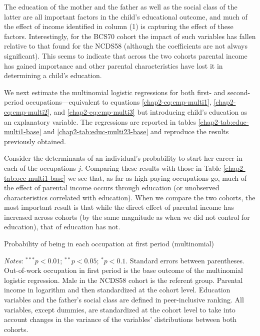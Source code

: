 The education of the mother and the father as well as the social class of the latter are all important factors in the child's educational outcome, and much of the effect of income identified in column (1) is capturing the effect of these factors. Interestingly, for the BCS70 cohort the impact of such variables has fallen relative to that found for the NCDS58 (although the coefficients are not always significant). This seems to indicate that across the two cohorts parental income has gained importance and other parental characteristics have lost it in determining a child's education.

We next estimate the multinomial logistic regressions for both first- and second-period occupations---equivalent to equations \eqref{chap2-eq:emp-multi1}, \eqref{chap2-eq:emp-multi2}, and \eqref{chap2-eq:emp-multi3} but introducing child's education as an explanatory variable.  The regressions are reported in tables \ref{chap2-tab:educ-multi1-base} and \ref{chap2-tab:educ-multi23-base} and reproduce the results previously obtained. 

Consider the determinants of an individual's probability to start her career in each of the occupations $j$. Comparing these results with those in Table  \ref{chap2-tab:occ-multi1-base} we see that, as far as high-paying occupations go, much of the effect of parental income occurs through education (or unobserved characteristics correlated with education). When we compare the two cohorts, the most important result is that while the direct effect of parental income has increased across cohorts (by the same magnitude as when we did not control for education), that of education has not. 
\begin{table}[!htb]
    \centering
    \caption{Probability of being in each occupation at first period (multinomial)}
    \label{chap2-tab:educ-multi1-base}
    \begin{threeparttable}
        \centering
        \setlength{\tabcolsep}{15pt}
        
        \begin{tablenotes}[flushleft]
            \footnotesize{\item \textit{Notes}: 
            $^{***}p<0.01$; $^{**}p<0.05$; $^{*}p<0.1$. Standard errors between parentheses. 
            Out-of-work occupation in first period is the base outcome of the multinomial logistic regression.
            Male in the NCDS58 cohort is the referent group. 
            Parental income in logarithm and then standardized at the cohort level.
            Education variables and the father’s social class are defined in peer-inclusive ranking. All variables, except dummies, are standardized at the cohort level to take into account changes in the variance of the variables’ distributions between both cohorts.}
        \end{tablenotes}
    \end{threeparttable}
\end{table}


